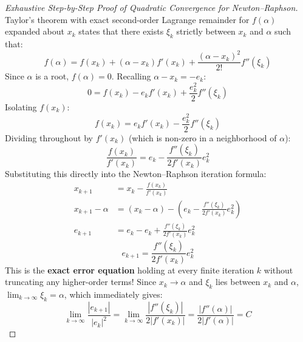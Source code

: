 \begin{proof}[Exhaustive Step-by-Step Proof of Quadratic Convergence for Newton--Raphson]
\noindent Taylor's theorem with exact second-order Lagrange remainder for $f(\alpha)$ expanded about $x_k$ states that there exists $\xi_k$ strictly between $x_k$ and $\alpha$ such that:
\begin{equation}
    f(\alpha) = f(x_k) + (\alpha - x_k) f'(x_k) + \frac{(\alpha - x_k)^2}{2!} f''(\xi_k)
\end{equation}
Since $\alpha$ is a root, $f(\alpha) = 0$. Recalling $\alpha - x_k = -e_k$:
\begin{equation}
    0 = f(x_k) - e_k f'(x_k) + \frac{e_k^2}{2} f''(\xi_k)
\end{equation}
Isolating $f(x_k)$:
\begin{equation}
    f(x_k) = e_k f'(x_k) - \frac{e_k^2}{2} f''(\xi_k)
\end{equation}
Dividing throughout by $f'(x_k)$ (which is non-zero in a neighborhood of $\alpha$):
\begin{equation}
    \frac{f(x_k)}{f'(x_k)} = e_k - \frac{f''(\xi_k)}{2 f'(x_k)} e_k^2
\end{equation}
Substituting this directly into the Newton--Raphson iteration formula:
\begin{align}
    x_{k+1} &= x_k - \frac{f(x_k)}{f'(x_k)} \nonumber \\
    x_{k+1} - \alpha &= (x_k - \alpha) - \left( e_k - \frac{f''(\xi_k)}{2 f'(x_k)} e_k^2 \right) \nonumber \\
    e_{k+1} &= e_k - e_k + \frac{f''(\xi_k)}{2 f'(x_k)} e_k^2
\end{align}
\begin{equation}
    \boxed{e_{k+1} = \frac{f''(\xi_k)}{2 f'(x_k)} e_k^2}
\end{equation}
This is the \textbf{exact error equation} holding at every finite iteration $k$ without truncating any higher-order terms! Since $x_k \to \alpha$ and $\xi_k$ lies between $x_k$ and $\alpha$, $\lim_{k \to \infty} \xi_k = \alpha$, which immediately gives:
\begin{equation}
    \lim_{k \to \infty} \frac{|e_{k+1}|}{|e_k|^2} = \lim_{k \to \infty} \frac{|f''(\xi_k)|}{2|f'(x_k)|} = \frac{|f''(\alpha)|}{2|f'(\alpha)|} = C
\end{equation}
\end{proof}


